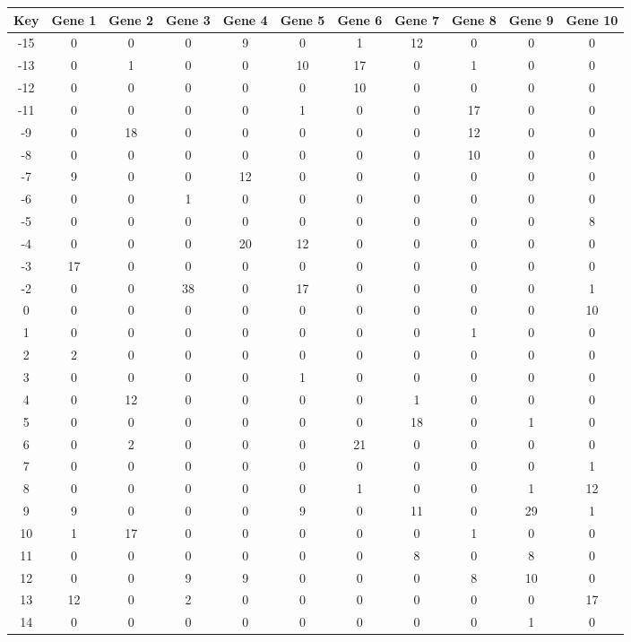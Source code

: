 \begin{tabular}{|c|c|c|c|c|c|c|c|c|c|c|}
\hline
Key & Gene 1 & Gene 2 & Gene 3 & Gene 4 & Gene 5 & Gene 6 & Gene 7 & Gene 8 & Gene 9 & Gene 10 \\
\hline
-15 & 0 & 0 & 0 & 9 & 0 & 1 & 12 & 0 & 0 & 0 \\
-13 & 0 & 1 & 0 & 0 & 10 & 17 & 0 & 1 & 0 & 0 \\
-12 & 0 & 0 & 0 & 0 & 0 & 10 & 0 & 0 & 0 & 0 \\
-11 & 0 & 0 & 0 & 0 & 1 & 0 & 0 & 17 & 0 & 0 \\
-9 & 0 & 18 & 0 & 0 & 0 & 0 & 0 & 12 & 0 & 0 \\
-8 & 0 & 0 & 0 & 0 & 0 & 0 & 0 & 10 & 0 & 0 \\
-7 & 9 & 0 & 0 & 12 & 0 & 0 & 0 & 0 & 0 & 0 \\
-6 & 0 & 0 & 1 & 0 & 0 & 0 & 0 & 0 & 0 & 0 \\
-5 & 0 & 0 & 0 & 0 & 0 & 0 & 0 & 0 & 0 & 8 \\
-4 & 0 & 0 & 0 & 20 & 12 & 0 & 0 & 0 & 0 & 0 \\
-3 & 17 & 0 & 0 & 0 & 0 & 0 & 0 & 0 & 0 & 0 \\
-2 & 0 & 0 & 38 & 0 & 17 & 0 & 0 & 0 & 0 & 1 \\
0 & 0 & 0 & 0 & 0 & 0 & 0 & 0 & 0 & 0 & 10 \\
1 & 0 & 0 & 0 & 0 & 0 & 0 & 0 & 1 & 0 & 0 \\
2 & 2 & 0 & 0 & 0 & 0 & 0 & 0 & 0 & 0 & 0 \\
3 & 0 & 0 & 0 & 0 & 1 & 0 & 0 & 0 & 0 & 0 \\
4 & 0 & 12 & 0 & 0 & 0 & 0 & 1 & 0 & 0 & 0 \\
5 & 0 & 0 & 0 & 0 & 0 & 0 & 18 & 0 & 1 & 0 \\
6 & 0 & 2 & 0 & 0 & 0 & 21 & 0 & 0 & 0 & 0 \\
7 & 0 & 0 & 0 & 0 & 0 & 0 & 0 & 0 & 0 & 1 \\
8 & 0 & 0 & 0 & 0 & 0 & 1 & 0 & 0 & 1 & 12 \\
9 & 9 & 0 & 0 & 0 & 9 & 0 & 11 & 0 & 29 & 1 \\
10 & 1 & 17 & 0 & 0 & 0 & 0 & 0 & 1 & 0 & 0 \\
11 & 0 & 0 & 0 & 0 & 0 & 0 & 8 & 0 & 8 & 0 \\
12 & 0 & 0 & 9 & 9 & 0 & 0 & 0 & 8 & 10 & 0 \\
13 & 12 & 0 & 2 & 0 & 0 & 0 & 0 & 0 & 0 & 17 \\
14 & 0 & 0 & 0 & 0 & 0 & 0 & 0 & 0 & 1 & 0 \\
\hline
\end{tabular}